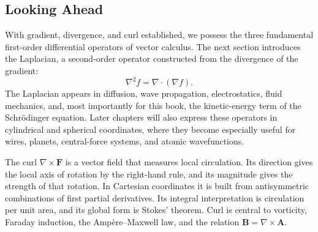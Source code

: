\subsection{Looking Ahead}

With gradient, divergence, and curl established, we possess the three
fundamental first-order differential operators of vector calculus. The next
section introduces the Laplacian, a second-order operator constructed from the
divergence of the gradient:
\[
\nabla^2 f=\nabla\cdot(\nabla f).
\]
The Laplacian appears in diffusion, wave propagation, electrostatics, fluid
mechanics, and, most importantly for this book, the kinetic-energy term of the
Schr\"odinger equation. Later chapters will also express these operators in
cylindrical and spherical coordinates, where they become especially useful for
wires, planets, central-force systems, and atomic wavefunctions.

\begin{summarybox}
The curl $\nabla\times\mathbf F$ is a vector field that measures local
circulation. Its direction gives the local axis of rotation by the right-hand
rule, and its magnitude gives the strength of that rotation. In Cartesian
coordinates it is built from antisymmetric combinations of first partial
derivatives. Its integral interpretation is circulation per unit area, and its
global form is Stokes' theorem. Curl is central to vorticity, Faraday induction,
the Amp\`ere--Maxwell law, and the relation $\mathbf B=\nabla\times\mathbf A$.
\end{summarybox}
